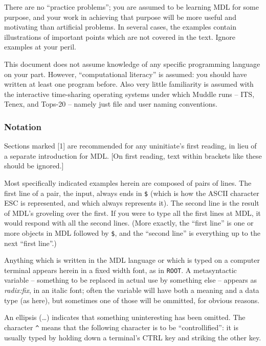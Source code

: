 \documentclass[a4paper,]{article}
\begin{document}
There are no ``practice problems''; you are assumed to be learning MDL for some purpose, and your work in achieving that
purpose will be more useful and motivating than artificial problems. In several cases, the examples contain illustrations
of important points which are not covered in the text. Ignore examples at your peril.

This document does not assume knowledge of any specific programming language on your part. However, ``computational
literacy'' is assumed: you should have written at least one program before. Also very little familiarity is assumed with
the interactive time-sharing operating systems under which Muddle runs -- ITS, Tenex, and Tops-20 -- namely just file and
user naming conventions.

\subsubsection{Notation}\label{notation}

Sections marked {[}1{]} are recommended for any uninitiate's first reading, in lieu of a separate introduction for MDL.
{[}On first reading, text within brackets like these should be ignored.{]}

Most specifically indicated examples herein are composed of pairs of lines. The first line of a pair, the input, always
ends in \texttt{\$}  (which is how the ASCII character ESC is represented, and which always
represents it). The second line is the result of MDL's groveling over the first. If you were to type all the first lines at
MDL, it would respond with all the second lines. (More exactly, the ``first line'' is one or more objects in MDL followed
by \texttt{\$}, and the ``second line'' is everything up to the next ``first line''.)

Anything which is written in the MDL language or which is typed on a computer terminal appears herein in a fixed width
font, as in \texttt{ROOT}. A metasyntactic variable -- something to be replaced in actual use by something else -- appears
as \emph{radix:fix}, in an italic font; often the variable will have both a meaning and a data type (as here), but
sometimes one of those will be ommitted, for obvious reasons.

An ellipsis (\ldots{}) indicates that something uninteresting has been omitted. The character
\texttt{\^{}} means that the following character is to be ``controllified'': it is usually
typed by holding down a terminal's CTRL key and striking the other key.
\end{document}
